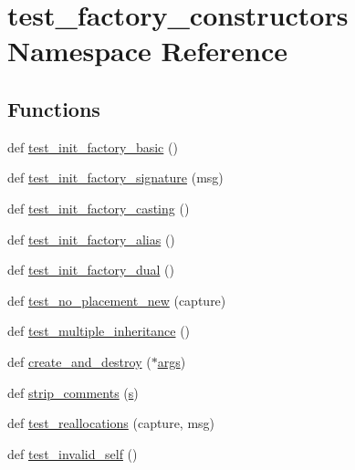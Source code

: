 \hypertarget{namespacetest__factory__constructors}{}\section{test\+\_\+factory\+\_\+constructors Namespace Reference}
\label{namespacetest__factory__constructors}
\subsection*{Functions}
\begin{DoxyCompactItemize}
\item 
def \mbox{\hyperlink{namespacetest__factory__constructors_aa99ea516cae29fd632c781042be898f7}{test\+\_\+init\+\_\+factory\+\_\+basic}} ()
\item 
def \mbox{\hyperlink{namespacetest__factory__constructors_a563534f0b537f502108400846e601e7e}{test\+\_\+init\+\_\+factory\+\_\+signature}} (msg)
\item 
def \mbox{\hyperlink{namespacetest__factory__constructors_a8f9e3e1bd478f1cd2345a9f5acc905f0}{test\+\_\+init\+\_\+factory\+\_\+casting}} ()
\item 
def \mbox{\hyperlink{namespacetest__factory__constructors_a6abfb6f0094575265aa7f56cc96f3dda}{test\+\_\+init\+\_\+factory\+\_\+alias}} ()
\item 
def \mbox{\hyperlink{namespacetest__factory__constructors_aaaf4589cbaad4b7dbcb58ed14c29176f}{test\+\_\+init\+\_\+factory\+\_\+dual}} ()
\item 
def \mbox{\hyperlink{namespacetest__factory__constructors_a3faaafdd3871dd00ba7adcd9d5484897}{test\+\_\+no\+\_\+placement\+\_\+new}} (capture)
\item 
def \mbox{\hyperlink{namespacetest__factory__constructors_ad9942dd4c8ef1d6cfdbdeb520b249fd7}{test\+\_\+multiple\+\_\+inheritance}} ()
\item 
def \mbox{\hyperlink{namespacetest__factory__constructors_afe537016cc9c6485f925b7d64b6f0b6a}{create\+\_\+and\+\_\+destroy}} ($\ast$\mbox{\hyperlink{classargs}{args}})
\item 
def \mbox{\hyperlink{namespacetest__factory__constructors_a9add4f5f7990684c56cdbac88df9c349}{strip\+\_\+comments}} (\mbox{\hyperlink{_s_d_l__opengl_8h_a4af680a6c683f88ed67b76f207f2e6e4}{s}})
\item 
def \mbox{\hyperlink{namespacetest__factory__constructors_ad053d88bf7b6fbf61c28b01872b4ffa9}{test\+\_\+reallocations}} (capture, msg)
\item 
def \mbox{\hyperlink{namespacetest__factory__constructors_af2f4c9d56a0e09246564df1471ca3971}{test\+\_\+invalid\+\_\+self}} ()
\end{DoxyCompactItemize}


